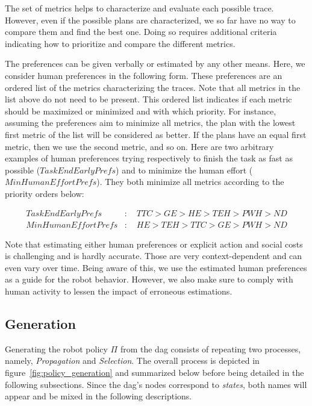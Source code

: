 The set of metrics helps to characterize and evaluate each possible trace. However, even if the possible plans are characterized, we so far have no way to compare them and find the best one. Doing so requires additional criteria indicating how to prioritize and compare the different metrics.

The preferences can be given verbally or estimated by any other means. Here, we consider human preferences in the following form. These preferences are an ordered list of the metrics characterizing the traces. Note that all metrics in the list above do not need to be present. This ordered list indicates if each metric should be maximized or minimized and with which priority. For instance, assuming the preferences aim to minimize all metrics, the plan with the lowest first metric of the list will be considered as better. If the plans have an equal first metric, then we use the second metric, and so on. Here are two arbitrary examples of human preferences trying respectively to finish the task as fast as possible ($TaskEndEarlyPrefs$) and to minimize the human effort ($MinHumanEffortPrefs$). They both minimize all metrics according to the priority orders below:

\begin{align*}
    TaskEndEarlyPrefs&: \quad TTC > GE > HE > TEH > PWH > ND \\
    MinHumanEffortPrefs&: \quad HE > TEH > TTC > GE > PWH > ND 
\end{align*}


Note that estimating either human preferences or explicit action and social costs is challenging and is hardly accurate. Those are very context-dependent and can even vary over time.
Being aware of this, we use the estimated human preferences as a guide for the robot behavior. However, we also make sure to comply with human activity to lessen the impact of erroneous estimations. 

    \subsection{Generation}

Generating the robot policy $\Pi$ from the \acrshort{dag} consists of repeating two processes, namely, \textit{Propagation} and \textit{Selection}. The overall process is depicted in figure~\ref{fig:policy_generation} and summarized below before being detailed in the following subsections. Since the \acrshort{dag}'s nodes correspond to \textit{states}, both names will appear and be mixed in the following descriptions. 

